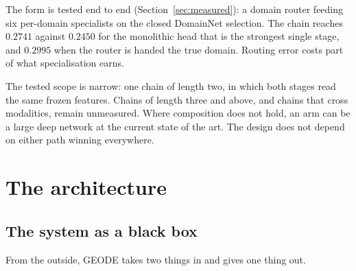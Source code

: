 \documentclass[11pt]{article}
\begin{document}
\begin{enumerate}
          The form is tested end to end (Section~\ref{sec:measured}): a
          domain router feeding six per-domain specialists on the closed
          DomainNet selection. The chain reaches $0.2741$ against $0.2450$
          for the monolithic head that is the strongest single stage, and
          $0.2995$ when the router is handed the true domain. Routing
          error costs part of what specialisation earns.

          The tested scope is narrow: one chain of length
          two, in which both stages read the same frozen features. Chains of
          length three and above, and chains that cross modalities, remain
          unmeasured. Where composition does not hold, an arm can be a large
          deep network at the current state of the art. The design does not
          depend on either path winning everywhere.
\end{enumerate}

\section{The architecture}

\subsection{The system as a black box}

From the outside, GEODE takes two things in and gives one thing out.
\end{document}
